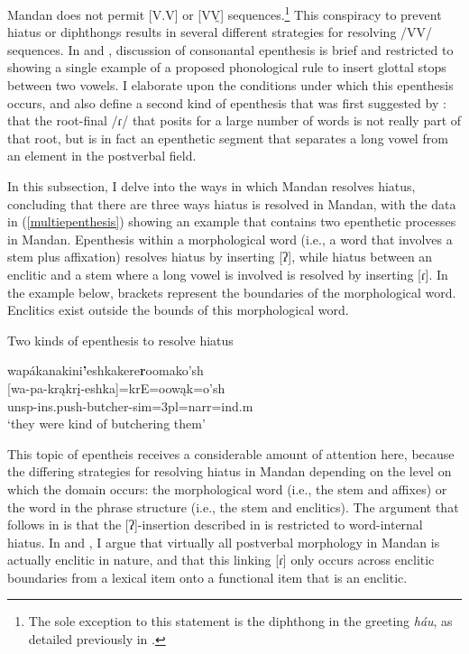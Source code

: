 Mandan does not permit [V.V] or [VV̯] sequences.\footnote{The sole exception to this statement is the diphthong in the greeting \textit{háu}, as detailed previously in .} This conspiracy to prevent hiatus or diphthongs results in several different strategies for resolving /VV/ sequences. In \citet{hollow1970} and \citet{mixco1997a}, discussion of consonantal epenthesis is brief and restricted to showing a single example of a proposed phonological rule to insert glottal stops between two vowels. I elaborate upon the conditions under which this epenthesis occurs, and also define a second kind of epenthesis that was first suggested by \citet{carter1991a}: that the root-final /ɾ/ that \citeauthor{hollow1970} posits for a large number of words is not really part of that root, but is in fact an epenthetic segment that separates a long vowel from an element in the postverbal field.

In this subsection, I delve into the ways in which Mandan resolves hiatus, concluding that there are three ways hiatus is resolved in Mandan, with the data in (\ref{multiepenthesis}) showing an example that contains two epenthetic processes in Mandan. Epenthesis within a morphological word (i.e., a word that involves a stem plus affixation) resolves hiatus by inserting [ʔ], while hiatus between an enclitic and a stem where a long vowel is involved is resolved by inserting [ɾ]. In the example below, brackets represent the boundaries of the morphological word. Enclitics exist outside the bounds of this morphological word.

\begin{exe}

	\item\label{multiepenthesis} Two kinds of epenthesis to resolve hiatus

	\glll wapákanakini\textbf{'}eshkakere\textbf{r}oomako'sh\\
		{[}wa-pa-krąkrį-eshka{]}=krE=oowąk=o'sh\\
		unsp-ins.push-\textnormal{butcher}-sim=3pl=narr=ind.m\\
		\glt `they were kind of butchering them' \citep[86]{hollow1973b}

\end{exe}

This topic of epentheis receives a considerable amount of attention here, because the differing strategies for resolving hiatus in Mandan depending on the level on which the domain occurs: the morphological word (i.e., the stem and affixes) or the word in the phrase structure (i.e., the stem and enclitics). The argument that follows in  is that the [ʔ]-insertion described in \citet{hollow1970} is restricted to word-internal hiatus. In  and , I argue that virtually all postverbal morphology in Mandan is actually enclitic in nature, and that this linking [ɾ] only occurs across enclitic boundaries from a lexical item onto a functional item that is an enclitic.


